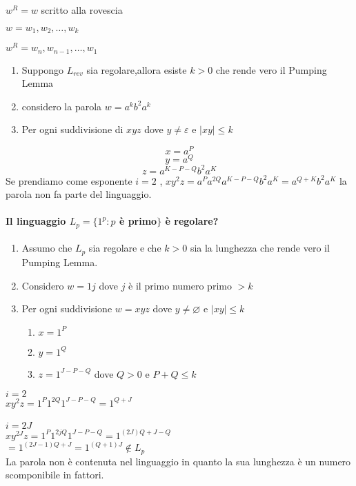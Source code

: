 $w^R = w$ scritto alla rovescia

$w = w_1, w_2, \dots, w_k$ 

$w^R=w_n, w_{n-1}, \dots, w_1$ 
\begin{enumerate}
	\item Suppongo $L_{rev}$ sia regolare,allora esiste $k>0$ che rende vero il Pumping Lemma
	\item considero la parola $w=a^kb^2a^k$ 
	\item Per ogni suddivisione di $xyz$ dove $y\neq \varepsilon$ e $|xy|\leq k$ 
\end{enumerate}
$$x = a^P$$
$$y = a^Q$$
$$z = a^{K-P-Q}b^2a^K$$
Se prendiamo come esponente $i=2$ , $xy^2z=a^Pa^{2Q}a^{K-P-Q}b^2a^K= a^{Q+K}b^2a^K$ la parola non fa parte del linguaggio.\\


\paragraph{Il linguaggio $L_{p} = \{1^p: p$  è primo$\}$ è regolare?}\nin
\begin{enumerate}
	\item Assumo che $L_p$ sia regolare e che $k>0$ sia la lunghezza che rende vero il Pumping Lemma. 
	\item Considero $w=1j$ dove $j$ è il primo numero primo $>k$ 
	\item Per ogni suddivisione $w=xyz$ dove $y\neq \varnothing$ e $|xy| \leq k$ 
		\begin{enumerate}
			\item $x=1^P$ 
			\item $y = 1^Q$ 
			\item $z=1^{J-P-Q}$ dove $Q>0$ e $P+Q \leq k$ 
		\end{enumerate}
\end{enumerate}

$i=2$ \\
$xy^2z = 1^P1^{2Q}1^{J-P-Q}=1^{Q+J}$\\
\\
$i=2J$\\
$xy^{2J}z = 1^P1^{2jQ}1^{J-P-Q}=1^{(2J)Q+J-Q}$\\
$= 1^{(2J-1)Q+J} = 1^{(Q+1)J} \not\in L_p$ \\
La parola non è contenuta nel linguaggio in quanto la sua lunghezza è un numero scomponibile in fattori. 


